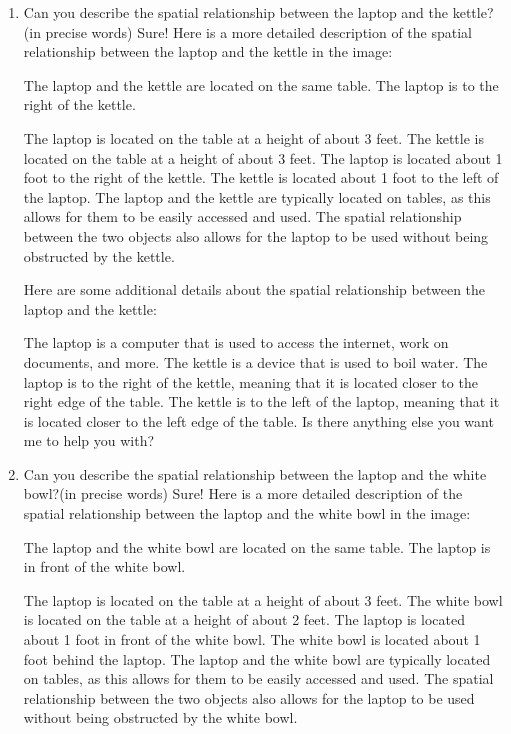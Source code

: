 \begin{enumerate}
    \item Can you describe the spatial relationship between the laptop and the kettle?(in precise words)
    \subitem Sure! Here is a more detailed description of the spatial relationship between the laptop and the kettle in the image:

    The laptop and the kettle are located on the same table. The laptop is to the right of the kettle.
    
    The laptop is located on the table at a height of about 3 feet.
    The kettle is located on the table at a height of about 3 feet.
    The laptop is located about 1 foot to the right of the kettle.
    The kettle is located about 1 foot to the left of the laptop.
    The laptop and the kettle are typically located on tables, as this allows for them to be easily accessed and used. The spatial relationship between the two objects also allows for the laptop to be used without being obstructed by the kettle.
    
    Here are some additional details about the spatial relationship between the laptop and the kettle:
    
    The laptop is a computer that is used to access the internet, work on documents, and more.
    The kettle is a device that is used to boil water.
    The laptop is to the right of the kettle, meaning that it is located closer to the right edge of the table.
    The kettle is to the left of the laptop, meaning that it is located closer to the left edge of the table.
    Is there anything else you want me to help you with?
    \item Can you describe the spatial relationship between the laptop and the white bowl?(in precise words)
    \subitem 
    Sure! Here is a more detailed description of the spatial relationship between the laptop and the white bowl in the image:
    
    The laptop and the white bowl are located on the same table. The laptop is in front of the white bowl.
    
    The laptop is located on the table at a height of about 3 feet.
    The white bowl is located on the table at a height of about 2 feet.
    The laptop is located about 1 foot in front of the white bowl.
    The white bowl is located about 1 foot behind the laptop.
    The laptop and the white bowl are typically located on tables, as this allows for them to be easily accessed and used. The spatial relationship between the two objects also allows for the laptop to be used without being obstructed by the white bowl.
    

\end{enumerate}

